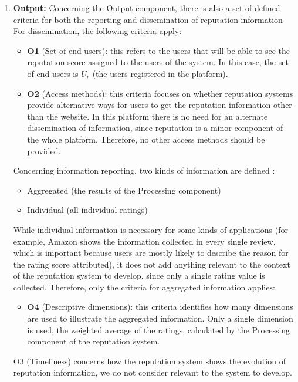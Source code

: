\begin{enumerate}
\item \textbf{Output:}
Concerning the Output component, there is also a set of defined criteria \cite{liu2012systematic} for both the reporting and dissemination of reputation information
For dissemination, the following criteria apply:
\begin{itemize}
\item \textbf{O1} (Set of end users): this refers to the users that will be able to see the reputation score assigned to the users of the system. In this case, the set of end users is \textit{$U_{r}$} (the users registered in the platform).
\item \textbf{O2} (Access methods): this criteria focuses on whether reputation systems provide alternative ways for users to get the reputation information other than the website. In this platform there is no need for an alternate dissemination of information, since reputation is a minor component of the whole platform. Therefore, no other access methods should be provided.
\end{itemize}
Concerning information reporting, two kinds of information are defined \cite{liu2012systematic}: 
\begin{itemize}
\item Aggregated (the results of the Processing component)
\item Individual (all individual ratings)
\end{itemize}  
While individual information is necessary for some kinds of applications (for example, Amazon shows the information collected in every single review, which is important because users are mostly likely to describe the reason for the rating score attributed), it does not add anything relevant to the context of the reputation system to develop, since only a single rating value is collected. Therefore, only the criteria for aggregated information applies:
\begin{itemize}
\item \textbf{O4} (Descriptive dimensions): this criteria identifies how many dimensions are used to illustrate the aggregated information. Only a single dimension is used, the weighted average of the ratings, calculated by the Processing component of the reputation system.
\end{itemize}

O3 (Timeliness) concerns how the reputation system shows the evolution of reputation information, we do not consider relevant to the system to develop.

\end{enumerate} %

